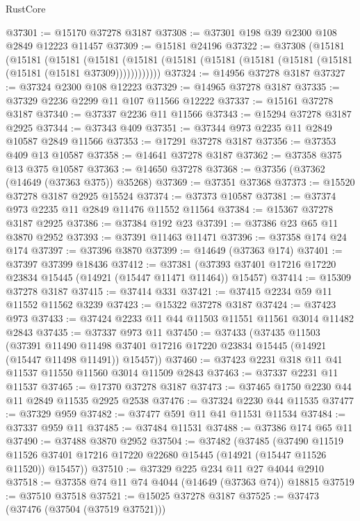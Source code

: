 \begin{lexlean}{RustCore}
\begin{coremodule}
@37301 := @15170 @37278 @3187
@37308 := @37301 @198 @39 @2300 @108 @2849 @12223 @11457
@37309 := @15181 @24196
@37322 := @37308
    (@15181
      (@15181
        (@15181
          (@15181 (@15181 (@15181 (@15181 (@15181 (@15181 (@15181 (@15181 (@15181 @37309))))))))))))
@37324 := @14956 @37278 @3187
@37327 := @37324 @2300 @108 @12223
@37329 := @14965 @37278 @3187
@37335 := @37329 @2236 @2299 @11 @107 @11566 @12222
@37337 := @15161 @37278 @3187
@37340 := @37337 @2236 @11 @11566
@37343 := @15294 @37278 @3187 @2925
@37344 := @37343 @409
@37351 := @37344 @973 @2235 @11 @2849 @10587 @2849 @11566
@37353 := @17291 @37278 @3187
@37356 := @37353 @409 @13 @10587
@37358 := @14641 @37278 @3187
@37362 := @37358 @375 @13 @375 @10587
@37363 := @14650 @37278
@37368 := @37356 (@37362 (@14649 (@37363 @375)) @35268)
@37369 := @37351 @37368
@37373 := @15520 @37278 @3187 @2925 @15524
@37374 := @37373 @10587
@37381 := @37374 @973 @2235 @11 @2849 @11476 @11552 @11564
@37384 := @15367 @37278 @3187 @2925
@37386 := @37384 @192 @23
@37391 := @37386 @23 @65 @11 @3870 @2952
@37393 := @37391 @11463 @11471
@37396 := @37358 @174 @24 @174
@37397 := @37396 @3870
@37399 := @14649 (@37363 @174)
@37401 := @37397 @37399 @18436
@37412 := @37381 (@37393 @37401 @17216 @17220 @23834 @15445 (@14921 (@15447 @11471 @11464)) @15457)
@37414 := @15309 @37278 @3187
@37415 := @37414 @331
@37421 := @37415 @2234 @59 @11 @11552 @11562 @3239
@37423 := @15322 @37278 @3187
@37424 := @37423 @973
@37433 := @37424 @2233 @11 @44 @11503 @11551 @11561 @3014 @11482 @2843
@37435 := @37337 @973 @11
@37450 := @37433
    (@37435
      @11503
      (@37391
        @11490
        @11498
        @37401
        @17216
        @17220
        @23834
        @15445
        (@14921 (@15447 @11498 @11491))
        @15457))
@37460 := @37423 @2231 @318 @11 @41 @11537 @11550 @11560 @3014 @11509 @2843
@37463 := @37337 @2231 @11 @11537
@37465 := @17370 @37278 @3187
@37473 := @37465 @1750 @2230 @44 @11 @2849 @11535 @2925 @2538
@37476 := @37324 @2230 @44 @11535
@37477 := @37329 @959
@37482 := @37477 @591 @11 @41 @11531 @11534
@37484 := @37337 @959 @11
@37485 := @37484 @11531
@37488 := @37386 @174 @65 @11
@37490 := @37488 @3870 @2952
@37504 := @37482
    (@37485
      (@37490
        @11519
        @11526
        @37401
        @17216
        @17220
        @22680
        @15445
        (@14921 (@15447 @11526 @11520))
        @15457))
@37510 := @37329 @225 @234 @11 @27 @4044 @2910
@37518 := @37358 @74 @11 @74 @4044 (@14649 (@37363 @74)) @18815
@37519 := @37510 @37518
@37521 := @15025 @37278 @3187
@37525 := @37473 (@37476 (@37504 (@37519 @37521)))

\end{coremodule}
\end{lexlean}
